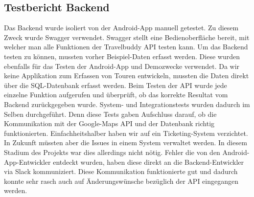 \subsection{Testbericht Backend}
\label{backendTestbericht}
Das Backend wurde isoliert von der Android-App manuell getestet. Zu diesem Zweck wurde Swagger verwendet. Swagger stellt eine Bedienoberfläche bereit, mit welcher man alle Funktionen der Travelbuddy API testen kann. Um das Backend testen zu können, mussten vorher Beispiel-Daten erfasst werden. Diese wurden ebenfalls für das Testen der Android-App und Demozwecke verwendet. Da wir keine Applikation zum Erfassen von Touren entwickeln, mussten die Daten direkt über die SQL-Datenbank erfasst werden. Beim Testen der API wurde jede einzelne Funktion aufgerufen und überprüft, ob das korrekte Resultat vom Backend zurückgegeben wurde. System- und Integrationstests wurden dadurch im Selben durchgeführt. Denn diese Tests gaben Aufschluss darauf, ob die Kommunikation mit der Google-Maps API und der Datenbank richtig funktionierten. Einfachheitshalber haben wir auf ein Ticketing-System verzichtet. In Zukunft müssten aber die Issues in einem System verwaltet werden. In diesem Stadium des Projekts war dies allerdings nicht nötig. Fehler die von den Android-App-Entwickler entdeckt wurden, haben diese direkt an die Backend-Entwickler via Slack kommuniziert. Diese Kommunikation funktionierte gut und dadurch konnte sehr rasch auch auf Änderungswünsche bezüglich der API eingegangen werden.
